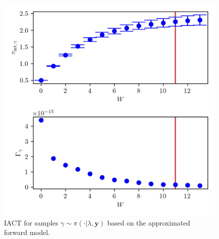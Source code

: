 \begin{figure}[ht!]
	\centering
	\includegraphics{UwerrTauIntSecO3gam.png}
	\caption[IACT and autocorrelation function for samples $\gamma \sim \pi( \cdot | \lambda, \bm{y})$]{IACT for samples $\gamma \sim \pi( \cdot | \lambda, \bm{y})$ based on the approximated forward model.}
	\label{fig:}
\end{figure}
